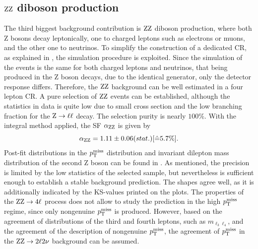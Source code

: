 \subsection{$\mathrm{Z}\mathrm{Z}$ diboson production}
The third biggest background contribution is $\mathrm{Z}\mathrm{Z}$ diboson production, where both Z bosons decay leptonically, one to charged leptons such as electrons or muons, and the other one to neutrinos. To simplify the construction of a dedicated CR, as explained in , the simulation procedure is exploited. Since the simulation of the events is the same for both charged leptons and neutrinos, that being produced in the Z boson decays, due to the identical generator, only the detector response differs. Therefore, the $\mathrm{Z}\mathrm{Z}$ background can be well estimated in a four lepton CR. A pure selection of $\mathrm{Z}\mathrm{Z}$ events can be established, although the statistics in data is quite low due to small cross section and the low branching fraction for the $\mathrm{Z}\to\ell\ell$ decay. The selection purity is nearly $100\%$.
%
With the integral method applied, the SF $\alpha_{\mathrm{Z}\mathrm{Z}}$ is given by
\begin{equation}\label{eq:AlphaZZ}
 \alpha_{\mathrm{Z}\mathrm{Z}}=1.11 \pm 0.06 (stat.) [\hat{=}5.7\%].
\end{equation}
Post-fit distributions in the $p_{\mathrm{T}}^\text{miss}$ distribution and invariant dilepton mass distribution of the second Z boson can be found in . As mentioned, the precision is limited by the low statistics of the selected sample, but nevertheless is sufficient enough to establish a stable background prediction. The shapes agree well, as it is additionally indicated by the KS-values printed on the plots. The properties of the $\mathrm{Z}\mathrm{Z}\to4\ell$ process does not allow to study the prediction in the high $p_{\mathrm{T}}^\text{miss}$ regime, since only nongenuine $p_{\mathrm{T}}^\text{miss}$ is produced. However, based on the agreement of distributions of the third and fourth leptons, such as $m_{\ell_3\ell_4}$, and the agreement of the description of nongenuine $p_{\mathrm{T}}^\text{miss}$, the agreement of $p_{\mathrm{T}}^\text{miss}$ in the $\mathrm{Z}\mathrm{Z}\to2\ell2\nu$ background can be assumed.
